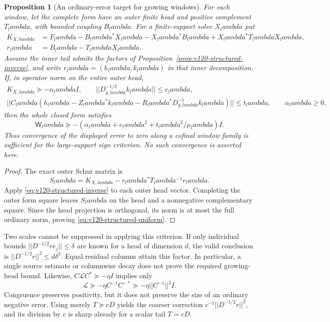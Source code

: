 \documentclass[11pt]{article}
\def\lambda{lambda}%
\def\norm#1{||#1||}%
\newtheorem{proposition}[theorem]{Proposition}
\theoremstyle{remark}
\newcommand{\norm}[1]{\left\lVert #1\right\rVert}
\begin{document}
\begin{proposition}[An ordinary-error target for growing windows]
\label{prop:v120-structured-uniform}
For each window, let the complete form have an outer finite head
and positive complement $T_\lambda$, with bounded coupling
$B_\lambda$. For a finite-support solve $X_\lambda$ put
\[
 \begin{split}
 K_{X,\lambda}&=F_\lambda-B_\lambda^*X_\lambda
       -X_\lambda^*B_\lambda+X_\lambda^*T_\lambda X_\lambda,\\
 r_\lambda&=B_\lambda-T_\lambda X_\lambda.
 \end{split}
\]
Assume the inner tail admits the factors of
Proposition~\ref{prop:v120-structured-inverse}, and write
$r_\lambda=(h_\lambda,k_\lambda)$ in that inner decomposition.
If, in operator norm on the entire outer head,
\[
 \begin{gathered}
 K_{X,\lambda}\succeq-\alpha_\lambda I,\qquad
 \norm{D_{g,\lambda}^{-1/2}k_\lambda}\le e_\lambda,\\
 \norm{C_\lambda(h_\lambda-Z_\lambda^*k_\lambda
       -R_\lambda^*D_{g,\lambda}^{-1}k_\lambda)}\le t_\lambda,
 \qquad \alpha_\lambda\ge0,
 \end{gathered}
\]
then the whole closed form satisfies
\begin{equation}\label{eq:v120-structured-uniform}
 \mathsf W_\lambda\succeq
 -\left(\alpha_\lambda+e_\lambda^2+
               t_\lambda^2/\mu_\lambda\right)I.
\end{equation}
Thus convergence of the displayed error to zero along a cofinal
window family is sufficient for the large-support sign criterion.
No such convergence is asserted here.
\end{proposition}
\begin{proof}
The exact outer Schur matrix is
\[
 S_\lambda=K_{X,\lambda}-r_\lambda^*T_\lambda^{-1}r_\lambda.
\]
Apply \eqref{eq:v120-structured-inverse} to each outer head vector.
Completing the outer form square leaves $S_\lambda$ on the head
and a nonnegative complementary square. Since the head projection
is orthogonal, its norm is at most the full ordinary norm, proving
\eqref{eq:v120-structured-uniform}.
\end{proof}

Two scales cannot be suppressed in applying this criterion.
If only individual bounds
$\norm{D^{-1/2}r e_j}\le\delta$ are known for a head of
dimension $d$, the valid conclusion is
$\norm{D^{-1/2}r}^2\le d\delta^2$. Equal residual columns
attain this factor. In particular, a single source estimate or
columnwise decay does not prove the required growing-head bound.
Likewise, $C\mathcal L C^*\succeq-\eta I$ implies only
\[
 \mathcal L\succeq-\eta C^{-1}C^{-*}
             \succeq-\eta\norm{C^{-1}}^2I.
\]
Congruence preserves positivity, but it does not preserve the size
of an ordinary negative error. Using merely $T\succeq cD$
yields the coarser correction
$c^{-1}\norm{D^{-1/2}r}^2$, and its division by $c$ is sharp
already for a scalar tail $T=cD$.
\end{document}

